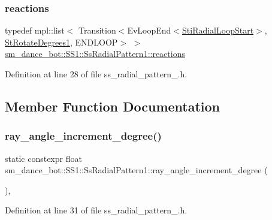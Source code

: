 \subsubsection{\texorpdfstring{reactions}{reactions}}
{\footnotesize\ttfamily typedef mpl\+::list$<$ Transition$<$Ev\+Loop\+End$<$\hyperlink{structsm__dance__bot_1_1radial__motion__states_1_1StiRadialLoopStart}{Sti\+Radial\+Loop\+Start}$>$, \hyperlink{structsm__dance__bot_1_1StRotateDegrees1}{St\+Rotate\+Degrees1}, E\+N\+D\+L\+O\+OP$>$ $>$ \hyperlink{structsm__dance__bot_1_1SS1_1_1SsRadialPattern1_a771bd101df407fefe77cd6932405c94a}{sm\+\_\+dance\+\_\+bot\+::\+S\+S1\+::\+Ss\+Radial\+Pattern1\+::reactions}}



Definition at line 28 of file ss\+\_\+radial\+\_\+pattern\+\_.\+h.



\subsection{Member Function Documentation}
\mbox{\label{structsm__dance__bot_1_1SS1_1_1SsRadialPattern1_a32a973bd088878e6c2b43b49bda2e2c9}} 
\subsubsection{\texorpdfstring{ray\+\_\+angle\+\_\+increment\+\_\+degree()}{ray\_angle\_increment\_degree()}}
{\footnotesize\ttfamily static constexpr float sm\+\_\+dance\+\_\+bot\+::\+S\+S1\+::\+Ss\+Radial\+Pattern1\+::ray\+\_\+angle\+\_\+increment\+\_\+degree (\begin{DoxyParamCaption}{ }\end{DoxyParamCaption})\hspace{0.3cm}{\ttfamily [inline]}, {\ttfamily [static]}}



Definition at line 31 of file ss\+\_\+radial\+\_\+pattern\+\_.\+h.


